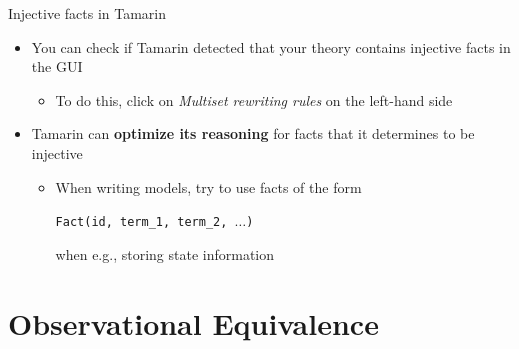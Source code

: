 \documentclass[11pt,aspectratio=169]{beamer}
\begin{document}
\begin{frame}[fragile]{Injective facts in Tamarin}
    \begin{itemize}
        \item You can check if Tamarin detected that your theory contains 
              injective facts in the GUI
        \begin{itemize}
            \item To do this, click on \textit{Multiset rewriting rules} on the 
                  left-hand side
        \end{itemize}
        \item Tamarin can \textbf{optimize its reasoning} for facts that it 
              determines to be injective
        \begin{itemize}
            \item When writing models, try to use facts of the form\\
            \begin{center}
                \texttt{Fact(\tildelow{}id, term\_1, term\_2, $\dots$)}\\
            \end{center}
            when e.g., storing state information
        \end{itemize}
    \end{itemize}
\end{frame}


\section{Observational Equivalence}

\end{document}
